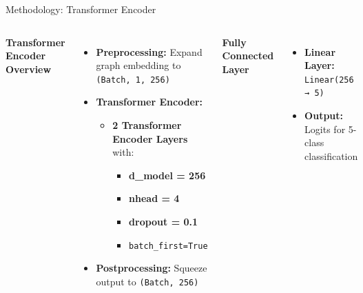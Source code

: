 \begin{frame}{Methodology: Transformer Encoder}
    \begin{columns}


        \textbf{\large Transformer Encoder Overview}
        \vspace{5pt}
        \begin{itemize}
            \item \textbf{Preprocessing:} Expand graph embedding to \texttt{(Batch, 1, 256)}
            \item \textbf{Transformer Encoder:} 
            \begin{itemize}
                \item \textbf{2 Transformer Encoder Layers} with:
                \begin{itemize}
                    \item \textbf{d\_model = 256}
                    \item \textbf{nhead = 4}
                    \item \textbf{dropout = 0.1}
                    \item \texttt{batch\_first=True}
                \end{itemize}
            \end{itemize}
            \item \textbf{Postprocessing:} Squeeze output to \texttt{(Batch, 256)}
        \end{itemize}

        \vspace{10pt}
        \textbf{\large Fully Connected Layer}
        \vspace{5pt}
        \begin{itemize}
            \item \textbf{Linear Layer:} \texttt{Linear(256 → 5)}
            \item \textbf{Output:} Logits for 5-class classification
        \end{itemize}


\end{columns}
\end{frame}
